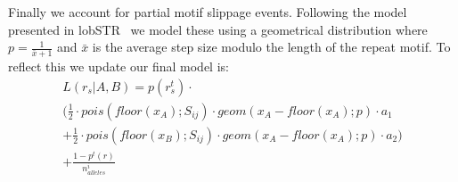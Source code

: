 \documentclass{bioinfo}
\begin{document}
\begin{methods}
Finally we account for partial motif slippage events. Following the model presented in lobSTR~\cite{Gymrek2012} we model these using 
a geometrical distribution where $p = \frac{1}{\bar{x}+1}$ and $\bar{x}$ is the average step size modulo the length of the repeat motif.
To reflect this we update our final model is:
\begin{multline}
    L(r_s|A,B) = p(r^t_s) \cdot \\
    \biggl(\frac{1}{2} \cdot pois(floor(x_A);S_{ij}) \cdot geom(x_A-floor(x_A);p) \cdot a_1 \\ + \frac{1}{2} \cdot pois(floor(x_B);S_{ij})\cdot geom(x_A-floor(x_A);p) \cdot a_2 \biggr) \\
    + \frac{1-p^t(r)}{n^i_{alleles}}
    \label{eq:likelihood4}
\end{multline}


\end{methods}
\end{document}

